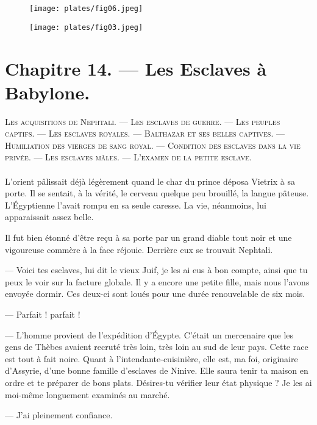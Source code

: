 \documentclass[a4paper, 11pt, oneside, polutonikogreek, french]{article}
\begin{document}
\begin{figure}[H]
\centering
\texttt{[image: plates/fig06.jpeg]}
\end{figure}
\clearpage
\begin{figure}[H]
\centering
\texttt{[image: plates/fig03.jpeg]}
\end{figure}
\section{Chapitre 14. --- Les Esclaves à Babylone.}
\begin{center}
\scshape
\small
Les acquisitions de Nephtali. --- Les esclaves de guerre. --- Les peuples captifs. --- Les esclaves royales. --- Balthazar et ses belles captives. --- Humiliation des vierges de sang royal. --- Condition des esclaves dans la vie privée. --- Les esclaves mâles. --- L'examen de la petite esclave.
\end{center}
\paragraph{}
L'orient pâlissait déjà légèrement quand le char du prince déposa Vietrix à sa porte. Il se sentait, à la vérité, le cerveau quelque peu brouillé, la langue pâteuse. L'Égyptienne l'avait rompu en sa seule caresse. La vie, néanmoins, lui apparaissait assez belle.

Il fut bien étonné d'être reçu à sa porte par un grand diable tout noir et une vigoureuse commère à la face réjouie. Derrière eux se trouvait Nephtali.

--- Voici tes esclaves, lui dit le vieux Juif, je les ai eus à bon compte, ainsi que tu peux le voir sur la facture globale. Il y a encore une petite fille, mais nous l'avons envoyée dormir. Ces deux-ci sont loués pour une durée renouvelable de six mois.

--- Parfait ! parfait !

--- L'homme provient de l'expédition d'Égypte. C'était un mercenaire que les gens de Thèbes avaient recruté très loin, très loin au sud de leur pays. Cette race est tout à fait noire. Quant à l'intendante-cuisinière, elle est, ma foi, originaire d'Assyrie, d'une bonne famille d'esclaves de Ninive. Elle saura tenir ta maison en ordre et te préparer de bons plats. Désires-tu vérifier leur état physique ? Je les ai moi-même longuement examinés au marché.

--- J'ai pleinement confiance.
\end{document}
